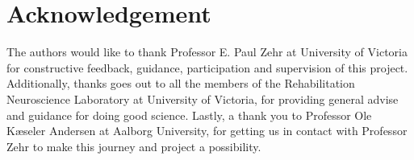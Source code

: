 \section*{Acknowledgement} 

The authors would like to thank Professor E. Paul Zehr at University of Victoria for constructive feedback, guidance, participation and supervision of this project. Additionally, thanks goes out to all the members of the Rehabilitation Neuroscience Laboratory at University of Victoria, for providing general advise and guidance for doing good science. Lastly, a thank you to Professor Ole Kæseler Andersen at Aalborg University, for getting us in contact with Professor Zehr to make this journey and project a possibility. 